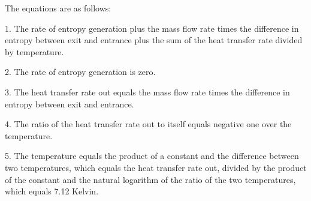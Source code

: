 The equations are as follows:

1. The rate of entropy generation plus the mass flow rate times the difference in entropy between exit and entrance plus the sum of the heat transfer rate divided by temperature.

2. The rate of entropy generation is zero.

3. The heat transfer rate out equals the mass flow rate times the difference in entropy between exit and entrance.

4. The ratio of the heat transfer rate out to itself equals negative one over the temperature.

5. The temperature equals the product of a constant and the difference between two temperatures, which equals the heat transfer rate out, divided by the product of the constant and the natural logarithm of the ratio of the two temperatures, which equals 7.12 Kelvin.